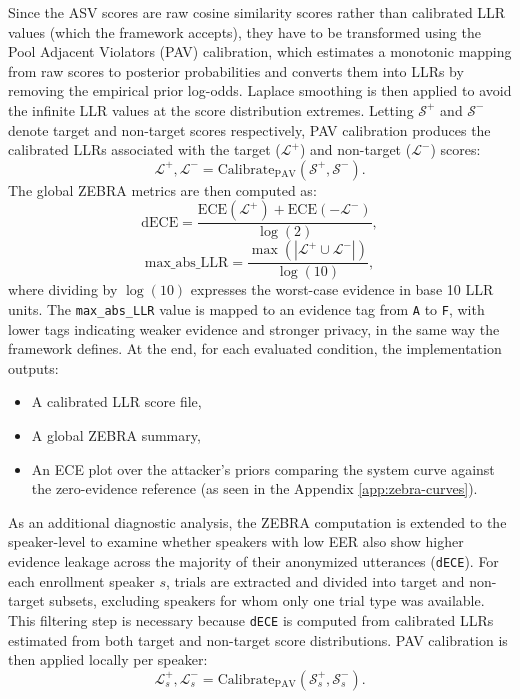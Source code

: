 \documentclass[12pt,leqno,a4paper]{article}
\begin{document}
Since the ASV scores are raw cosine similarity scores rather than calibrated LLR 
values (which the framework accepts), they have to be transformed using the Pool Adjacent Violators (PAV) calibration, which estimates a monotonic mapping from raw scores to 
posterior probabilities and converts them into LLRs by removing the 
empirical prior log-odds. Laplace smoothing is then applied to avoid the infinite 
LLR values at the score distribution extremes. Letting $\mathcal{S}^{+}$ 
and $\mathcal{S}^{-}$ denote target and non-target scores respectively, PAV calibration produces the calibrated LLRs associated with the target ($\mathcal{L}^{+}$) and non-target ($\mathcal{L}^{-}$) scores:
\begin{equation}
\mathcal{L}^{+}, \mathcal{L}^{-}
=
\mathrm{Calibrate}_{\mathrm{PAV}}
\left(
\mathcal{S}^{+}, \mathcal{S}^{-}
\right).
\end{equation}
The global ZEBRA metrics are then computed as:
\begin{equation}
\mathrm{dECE}
=
\frac{
\mathrm{ECE}(\mathcal{L}^{+})
+
\mathrm{ECE}(-\mathcal{L}^{-})
}{
\log(2)
},
\end{equation}
\begin{equation}
\mathrm{max\_abs\_LLR}
=
\frac{
\max \left(
\left|
\mathcal{L}^{+} \cup \mathcal{L}^{-}
\right|
\right)
}{
\log(10)
},
\end{equation}
where dividing by $\log(10)$ expresses the worst-case evidence in base 10 
LLR units. The \texttt{max\_abs\_LLR} value is mapped to an evidence 
tag from \texttt{A} to \texttt{F}, with lower tags indicating weaker 
evidence and stronger privacy, in the same way the framework defines. At the end, for each evaluated condition, the implementation outputs:
 \begin{itemize}
     \item A calibrated LLR score file,
     \item A global ZEBRA summary,
     \item An ECE plot over the attacker's priors comparing the system curve against the zero-evidence reference (as seen in the Appendix \ref{app:zebra-curves}).
 \end{itemize}

As an additional diagnostic analysis, the ZEBRA computation is extended 
to the speaker-level to examine whether speakers with low EER also show 
higher evidence leakage across the majority of their anonymized utterances (\texttt{dECE}). For each enrollment speaker $s$, trials are extracted and 
divided into target and non-target subsets, excluding speakers for whom 
only one trial type was available. This filtering step is necessary because \texttt{dECE} is computed from calibrated LLRs estimated from both target and non-target score distributions. PAV calibration is then applied locally per speaker:
\begin{equation}
\mathcal{L}^{+}_{s}, \mathcal{L}^{-}_{s}
=
\mathrm{Calibrate}_{\mathrm{PAV}}
\left(
\mathcal{S}^{+}_{s}, \mathcal{S}^{-}_{s}
\right).
\end{equation}
\end{document}
